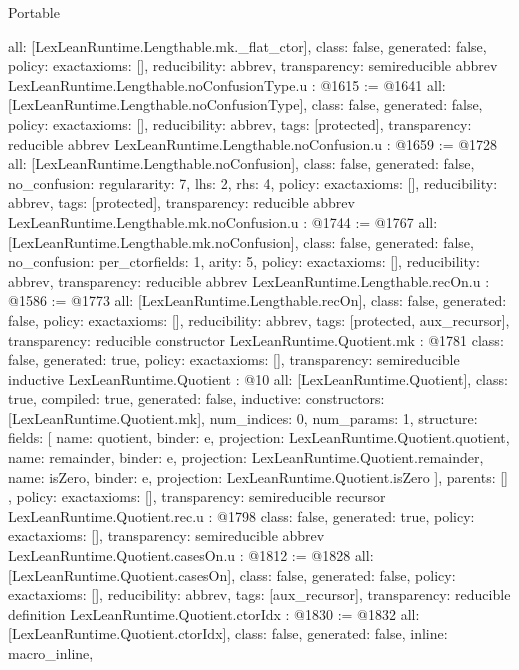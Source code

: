 \begin{lexlean}{Portable}
\begin{coremodule}
{  all: [LexLeanRuntime.Lengthable.mk._flat_ctor],
  class: false,
  generated: false,
  policy: exact{axioms: []},
  reducibility: abbrev{},
  transparency: semireducible
}
abbrev LexLeanRuntime.Lengthable.noConfusionType.{u} : @1615 := @1641 {
  all: [LexLeanRuntime.Lengthable.noConfusionType],
  class: false,
  generated: false,
  policy: exact{axioms: []},
  reducibility: abbrev{},
  tags: [protected],
  transparency: reducible
}
abbrev LexLeanRuntime.Lengthable.noConfusion.{u} : @1659 := @1728 {
  all: [LexLeanRuntime.Lengthable.noConfusion],
  class: false,
  generated: false,
  no_confusion: regular{arity: 7, lhs: 2, rhs: 4},
  policy: exact{axioms: []},
  reducibility: abbrev{},
  tags: [protected],
  transparency: reducible
}
abbrev LexLeanRuntime.Lengthable.mk.noConfusion.{u} : @1744 := @1767 {
  all: [LexLeanRuntime.Lengthable.mk.noConfusion],
  class: false,
  generated: false,
  no_confusion: per_ctor{fields: 1, arity: 5},
  policy: exact{axioms: []},
  reducibility: abbrev{},
  transparency: reducible
}
abbrev LexLeanRuntime.Lengthable.recOn.{u} : @1586 := @1773 {
  all: [LexLeanRuntime.Lengthable.recOn],
  class: false,
  generated: false,
  policy: exact{axioms: []},
  reducibility: abbrev{},
  tags: [protected, aux_recursor],
  transparency: reducible
}
constructor LexLeanRuntime.Quotient.mk : @1781 {
  class: false,
  generated: true,
  policy: exact{axioms: []},
  transparency: semireducible
}
inductive LexLeanRuntime.Quotient : @10 {
  all: [LexLeanRuntime.Quotient],
  class: true,
  compiled: true,
  generated: false,
  inductive: {
    constructors: [LexLeanRuntime.Quotient.mk],
    num_indices: 0,
    num_params: 1,
    structure: {
      fields: [
        {name: quotient, binder: e, projection: LexLeanRuntime.Quotient.quotient},
        {name: remainder, binder: e, projection: LexLeanRuntime.Quotient.remainder},
        {name: isZero, binder: e, projection: LexLeanRuntime.Quotient.isZero}
      ],
      parents: []
    }
  },
  policy: exact{axioms: []},
  transparency: semireducible
}
recursor LexLeanRuntime.Quotient.rec.{u} : @1798 {
  class: false,
  generated: true,
  policy: exact{axioms: []},
  transparency: semireducible
}
abbrev LexLeanRuntime.Quotient.casesOn.{u} : @1812 := @1828 {
  all: [LexLeanRuntime.Quotient.casesOn],
  class: false,
  generated: false,
  policy: exact{axioms: []},
  reducibility: abbrev{},
  tags: [aux_recursor],
  transparency: reducible
}
definition LexLeanRuntime.Quotient.ctorIdx : @1830 := @1832 {
  all: [LexLeanRuntime.Quotient.ctorIdx],
  class: false,
  generated: false,
  inline: macro_inline,
}
\end{coremodule}
\end{lexlean}

